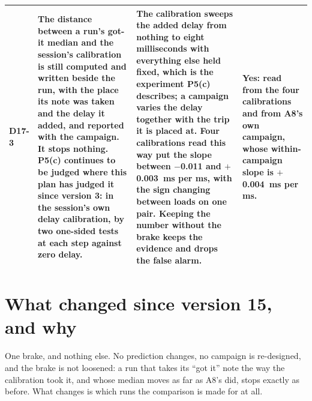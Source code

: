 \documentclass[11pt]{article}
\begin{document}
{\begin{longtable}{@{}p{1.1cm} >{\raggedright\arraybackslash}p{6.1cm} >{\raggedright\arraybackslash}p{6.0cm} >{\raggedright\arraybackslash}p{2.2cm}@{}}
D17-3 & The distance between a run's got-it median and the session's calibration is still computed and written beside the run, with the place its note was taken and the delay it added, and reported with the campaign. It stops nothing. P5(c) continues to be judged where this plan has judged it since version 3: in the session's own delay calibration, by two one-sided tests at each step against zero delay. & The calibration sweeps the added delay from nothing to eight milliseconds with everything else held fixed, which is the experiment P5(c) describes; a campaign varies the delay together with the trip it is placed at. Four calibrations read this way put the slope between $-$0.011 and $+$0.003~ms per ms, with the sign changing between loads on one pair. Keeping the number without the brake keeps the evidence and drops the false alarm. & \textbf{Yes:} read from the four calibrations and from A8's own campaign, whose within-campaign slope is $+$0.004~ms per ms. \\
\bottomrule
\end{longtable}}

\section*{What changed since version 15, and why}
One brake, and nothing else. No prediction changes, no campaign is re-designed, and the brake is not loosened: a run that takes its ``got it'' note the way the calibration took it, and whose median moves as far as A8's did, stops exactly as before. What changes is which runs the comparison is made for at all.
\end{document}
